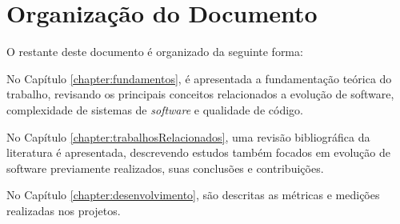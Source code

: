 \section{Organização do Documento}

O restante deste documento é organizado da seguinte forma:


No Capítulo \ref{chapter:fundamentos}, é apresentada a fundamentação teórica do trabalho, revisando
os principais conceitos relacionados a evolução de software, complexidade de sistemas de \textit{software} e qualidade de código.

No Capítulo \ref{chapter:trabalhosRelacionados}, uma revisão bibliográfica da literatura é apresentada, descrevendo estudos também focados em evolução de software previamente realizados, suas conclusões e 
contribuições.

No Capítulo \ref{chapter:desenvolvimento}, são descritas as métricas e medições realizadas nos projetos.